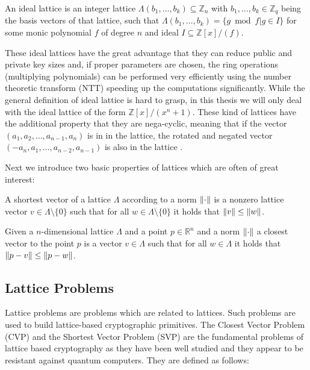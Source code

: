 \begin{definition}
An ideal lattice is an integer lattice $Λ(b_1, \ldots, b_k) \subseteq \mathds{Z}_n$ with $b_1, \ldots, b_k \in \mathds{Z}_q$ being the basis vectors of that lattice, such that $Λ(b_1, \ldots, b_k) = \{g \bmod f \vert g \in I\}$ for some monic polynomial $f$ of degree $n$ and ideal $I \subseteq \mathds{Z}[x]/(f)$.
\end{definition}

These ideal lattices have the great advantage that they can reduce public and private key sizes and, if proper parameters are chosen, the ring operations (multiplying polynomials) can be performed very efficiently using the number theoretic transform (NTT) \cite{ntt} speeding up the computations significantly. While the general definition of ideal lattice is hard to grasp, in this thesis we will only deal with the ideal lattice of the form $\mathds{Z}[x]/(x^n + 1)$. These kind of lattices have the additional property that they are nega-cyclic, meaning that if the vector $(a_1, a_2, \ldots, a_{n-1}, a_n)$ is in in the lattice, the rotated and negated vector $(-a_n, a_1, \ldots, a_{n-2}, a_{n-1})$ is also in the lattice \cite[p.~166]{negadesc}.


Next we introduce two basic properties of lattices which are often of great interest:

\begin{definition}
A shortest vector of a lattice $Λ$ according to a norm $\lVert\cdot\rVert$ is a nonzero lattice vector $v \in Λ \setminus \{0\}$ such that for all $w \in Λ \setminus \{0\}$ it holds that $\lVert v\rVert \leq \lVert w\rVert$.
\end{definition}

\begin{definition}
Given a $n$-dimensional lattice $Λ$ and a point $p \in \mathds{R}^n$ and a norm $\lVert\cdot\rVert$
a closest vector to the point $p$ is a vector $v \in Λ$ such that for all $w \in Λ$ it holds that $\lVert p - v\rVert \leq \lVert p - w\rVert$.
\end{definition}




\subsection{Lattice Problems}
Lattice problems are problems which are related to lattices. Such problems are used to build lattice-based cryptographic primitives.
The Closest Vector Problem (CVP) and the Shortest Vector Problem (SVP) are the fundamental problems of lattice based cryptography as they have been well studied and they appear to be resistant against quantum computers. They are defined as follows:

